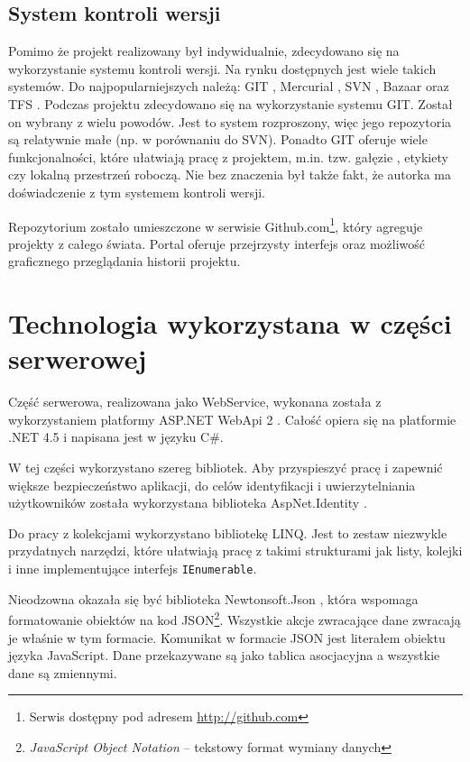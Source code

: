 \documentclass{book}
\begin{document}
			\subsection{System kontroli wersji}
			
			Pomimo że projekt realizowany był indywidualnie, zdecydowano się na wykorzystanie systemu kontroli wersji. Na rynku dostępnych jest wiele takich systemów. Do najpopularniejszych należą: GIT \cite{id:GIT}, Mercurial \cite{id:Mecurial}, SVN \cite{id:SVN}, Bazaar \cite{id:Bazaar} oraz TFS \cite{id:TFS}.
			Podczas projektu zdecydowano się na wykorzystanie systemu GIT. Został on wybrany z wielu powodów. Jest to system rozproszony, więc jego repozytoria są relatywnie małe (np. w porównaniu do SVN). Ponadto GIT oferuje wiele funkcjonalności, które ułatwiają pracę z projektem, m.in. tzw. gałęzie , etykiety czy lokalną przestrzeń roboczą. Nie bez znaczenia był także fakt, że autorka ma doświadczenie z tym systemem kontroli wersji.

			Repozytorium zostało umieszczone w serwisie Github.com\footnote{Serwis dostępny pod adresem \url{http://github.com}}, który agreguje projekty z całego świata. Portal oferuje przejrzysty interfejs oraz możliwość graficznego przeglądania historii projektu.
		
		\section{Technologia wykorzystana w części serwerowej}
		
		Część serwerowa, realizowana jako WebService, wykonana została z wykorzystaniem platformy ASP.NET WebApi 2 \cite{id:WebApi}. Całość opiera się na platformie .NET 4.5 i napisana jest w języku C\#.
		
		W tej części wykorzystano szereg bibliotek. Aby przyspieszyć pracę i zapewnić większe bezpieczeństwo aplikacji, do celów identyfikacji i uwierzytelniania użytkowników została wykorzystana biblioteka AspNet.Identity \cite{id:ASPIdentity}.
		
		Do pracy z kolekcjami wykorzystano bibliotekę LINQ. Jest to zestaw niezwykle przydatnych narzędzi, które ułatwiają pracę z takimi strukturami jak listy, kolejki i inne implementujące interfejs \texttt{IEnumerable}.
		
		Nieodzowna okazała się być biblioteka Newtonsoft.Json \cite{id:NewtonsoftJSON}, która wspomaga formatowanie obiektów na kod JSON\footnote{\emph{JavaScript Object Notation} -- tekstowy format wymiany danych}. Wszystkie akcje zwracające dane zwracają je właśnie w tym formacie. Komunikat w formacie JSON jest literałem obiektu języka JavaScript. Dane przekazywane są jako tablica asocjacyjna a wszystkie dane są zmiennymi.
		
\end{document}
